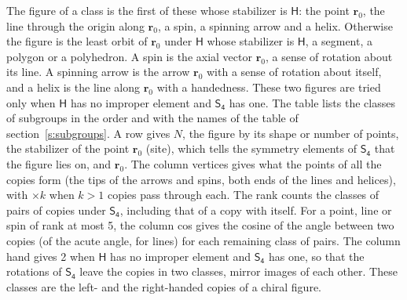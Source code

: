\documentclass[10pt,a4paper]{article}
\numberwithin{equation}{section}
\newcommand{\grp}[1]{\mathsf{#1}}
\newcommand{\pointr}{\mathbf{r}}
\begin{document}
\leavevmode\label{n:head.figure}The figure of a class is the first of these whose stabilizer is $\grp{H}$: the point $\pointr_0$, the line through the origin along $\pointr_0$, a spin, a spinning arrow and a helix. Otherwise the figure is the least orbit of $\pointr_0$ under $\grp{H}$ whose stabilizer is $\grp{H}$, a segment, a polygon or a polyhedron. A spin is the axial vector $\pointr_0$, a sense of rotation about its line. A spinning arrow is the arrow $\pointr_0$ with a sense of rotation about itself, and a helix is the line along $\pointr_0$ with a handedness. These two figures are tried only when $\grp{H}$ has no improper element and $\grp{S_{4}}$ has one. The table lists the classes of subgroups in the order and with the names of the table of section~\ref{s:subgroups}. \label{n:head.site}A row gives $N$, the figure by its shape or number of points, the stabilizer of the point $\pointr_0$ (site), which tells the symmetry elements of $\grp{S_{4}}$ that the figure lies on, and $\pointr_0$. \label{n:head.vertices}The column vertices gives what the points of all the copies form (the tips of the arrows and spins, both ends of the lines and helices), with ${\times}k$ when $k > 1$ copies pass through each. \label{n:head.rank}The rank counts the classes of pairs of copies under $\grp{S_{4}}$, including that of a copy with itself. \label{n:head.cos}For a point, line or spin of rank at most 5, the column cos gives the cosine of the angle between two copies (of the acute angle, for lines) for each remaining class of pairs. \label{n:head.hand}The column hand gives 2 when $\grp{H}$ has no improper element and $\grp{S_{4}}$ has one, so that the rotations of $\grp{S_{4}}$ leave the copies in two classes, mirror images of each other. These classes are the left- and the right-handed copies of a chiral figure.
\end{document}
